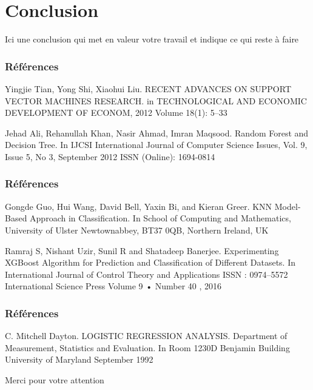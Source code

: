 \documentclass[xelatex,12pt]{beamer}
\begin{document}

\section{Conclusion}
  \begin{frame}
  \begin{block}{}
  Ici une conclusion qui met en valeur votre travail et indique ce qui reste à faire
  \end{block}
  \end{frame}

\begin{frame}
\frametitle{Références}
\begin{thebibliography}{9}
Yingjie Tian, Yong Shi, Xiaohui Liu. RECENT ADVANCES ON SUPPORT VECTOR MACHINES RESEARCH.  in TECHNOLOGICAL AND ECONOMIC DEVELOPMENT OF ECONOM, 2012  Volume 18(1): 5–33


Jehad Ali, Rehanullah Khan, Nasir Ahmad, Imran Maqsood. Random Forest and Decision Tree. In  IJCSI International Journal of Computer Science Issues, Vol. 9, Issue 5, No 3, September 2012 ISSN (Online): 1694-0814



\end{thebibliography}
\end{frame}
\begin{frame}
\frametitle{Références}
\begin{thebibliography}{9}
Gongde Guo, Hui Wang, David Bell, Yaxin Bi, and Kieran Greer. KNN Model-Based Approach in Classification. In School of Computing and Mathematics, University of Ulster Newtownabbey, BT37 0QB, Northern Ireland, UK


Ramraj S, Nishant Uzir, Sunil R  and Shatadeep Banerjee. Experimenting XGBoost Algorithm for Prediction and Classification of Different Datasets. In International Journal of Control Theory and Applications ISSN : 0974–5572 International Science Press Volume 9  •  Number 40  , 2016


\end{thebibliography}
\end{frame}
\begin{frame}
\frametitle{Références}
\begin{thebibliography}{9}
C. Mitchell Dayton. LOGISTIC REGRESSION ANALYSIS. Department of Measurement, Statistics and Evaluation.  In Room 1230D Benjamin Building University of Maryland September 1992

\end{thebibliography}
\end{frame}

\begin{frame}
  \begin{block}{}
  \centering
  Merci pour votre attention
  \end{block}
\end{frame}
\end{document}
